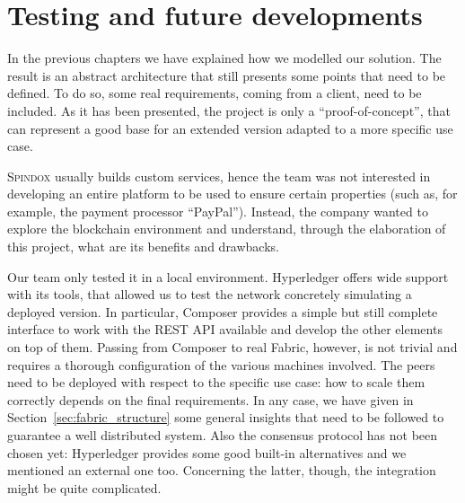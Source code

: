 \newpage
\chapter{Testing and future developments}
\label{cha:future}

In the previous chapters we have explained how we modelled our solution. The result is an abstract architecture that still presents some points that need to be defined. To do so, some real requirements, coming from a client, need to be included. As it has been presented, the project is only a ``proof-of-concept'', that can represent a good base for an extended version adapted to a more specific use case.

\textsc{Spindox} usually builds custom services, hence the team was not interested in developing an entire platform to be used to ensure certain properties (such as, for example, the payment processor ``PayPal''). Instead, the company wanted to explore the blockchain environment and understand, through the elaboration of this project, what are its benefits and drawbacks. 

Our team only tested it in a local environment. Hyperledger offers wide support with its tools, that allowed us to test the network concretely simulating a deployed version. In particular, Composer provides a simple but still complete interface to work with the REST API available and develop the other elements on top of them. Passing from Composer to real Fabric, however, is not trivial and requires a thorough configuration of the various machines involved. The peers need to be deployed with respect to the specific use case: how to scale them correctly depends on the final requirements. In any case, we have given in Section~\ref{sec:fabric_structure} some general insights that need to be followed to guarantee a well distributed system. Also the consensus protocol has not been chosen yet: Hyperledger provides some good built-in alternatives and we mentioned an external one too. Concerning the latter, though, the integration might be quite complicated.

